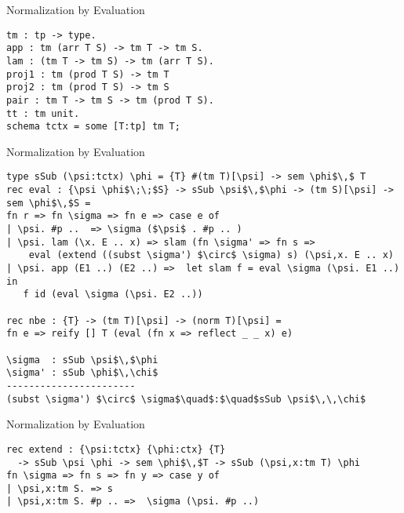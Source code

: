 \documentclass{beamer}
\begin{document}
\begin{frame}[fragile]{Normalization by Evaluation}
\begin{lstlisting}
tm : tp -> type.
app : tm (arr T S) -> tm T -> tm S.
lam : (tm T -> tm S) -> tm (arr T S).
proj1 : tm (prod T S) -> tm T
proj2 : tm (prod T S) -> tm S
pair : tm T -> tm S -> tm (prod T S).
tt : tm unit.
schema tctx = some [T:tp] tm T;
\end{lstlisting}
\end{frame}

\begin{frame}[fragile]{Normalization by Evaluation}
\begin{lstlisting}
type sSub (\psi:tctx) \phi = {T} #(tm T)[\psi] -> sem \phi$\,$ T
rec eval : {\psi \phi$\;\;$S} -> sSub \psi$\,$\phi -> (tm S)[\psi] -> sem \phi$\,$S =
fn r => fn \sigma => fn e => case e of 
| \psi. #p ..  => \sigma ($\psi$ . #p .. )
| \psi. lam (\x. E .. x) => slam (fn \sigma' => fn s =>
    eval (extend ((subst \sigma') $\circ$ \sigma) s) (\psi,x. E .. x)
| \psi. app (E1 ..) (E2 ..) =>  let slam f = eval \sigma (\psi. E1 ..) in
   f id (eval \sigma (\psi. E2 ..))

rec nbe : {T} -> (tm T)[\psi] -> (norm T)[\psi] = 
fn e => reify [] T (eval (fn x => reflect _ _ x) e)

\sigma  : sSub \psi$\,$\phi
\sigma' : sSub \phi$\,\chi$
-----------------------
(subst \sigma') $\circ$ \sigma$\quad$:$\quad$sSub \psi$\,\,\chi$
\end{lstlisting}
\end{frame}

\begin{frame}[fragile]{Normalization by Evaluation}
\begin{lstlisting}
rec extend : {\psi:tctx} {\phi:ctx} {T}
  -> sSub \psi \phi -> sem \phi$\,$T -> sSub (\psi,x:tm T) \phi
fn \sigma => fn s => fn y => case y of
| \psi,x:tm S. => s
| \psi,x:tm S. #p .. =>  \sigma (\psi. #p ..)
\end{lstlisting}
\end{frame}
\end{document}

